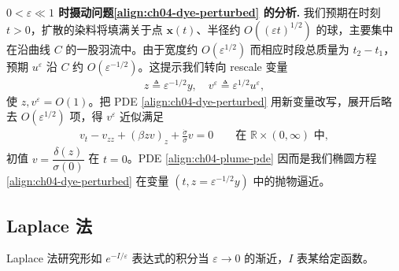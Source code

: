\documentclass[../../main.tex]{subfiles}
\begin{document}
\begin{example}[输运与小扩散]
\textbf{$0<\varepsilon\ll 1$ 时摄动问题\eqref{align:ch04-dye-perturbed} 的分析.} 我们预期在时刻 $t>0$，扩散的染料将填满关于点 $\mathbf{x}(t)$、半径约 $O((\varepsilon t)^{1/2})$ 的球，主要集中在沿曲线 $C$ 的一股羽流中。由于宽度约 $O(\varepsilon^{1/2})$ 而相应时段总质量为 $t_2-t_1$，预期 $u^\varepsilon$ 沿 $C$ 约 $O(\varepsilon^{-1/2})$。这提示我们转向 rescale 变量
\begin{align}\label{align:ch04-rescale}
z\triangleq\varepsilon^{-1/2}y,\quad v^\varepsilon\triangleq\varepsilon^{1/2}u^\varepsilon,
\end{align}
使 $z,v^\varepsilon=O(1)$。把 PDE \eqref{align:ch04-dye-perturbed} 用新变量改写，展开后略去 $O(\varepsilon^{1/2})$ 项，得 $v^\varepsilon$ 近似满足
\begin{align}\label{align:ch04-plume-pde}
v_t-v_{zz}+(\beta z v)_z+\frac{\dot{\sigma}}{\sigma}v=0 \qquad\text{在 }\mathbb{R}\times(0,\infty)\text{ 中},
\end{align}
初值 $v=\dfrac{\delta(z)}{\sigma(0)}$ 在 $t=0$。PDE \eqref{align:ch04-plume-pde} 因而是我们椭圆方程\eqref{align:ch04-dye-perturbed} 在变量 $(t,z=\varepsilon^{-1/2}y)$ 中的抛物逼近。
\end{example}

\subsection{Laplace 法}\label{subsection:ch04-laplace-method}

Laplace 法研究形如 $e^{-I/\varepsilon}$ 表达式的积分当 $\varepsilon\to 0$ 的渐近，$I$ 表某给定函数。
\end{document}
